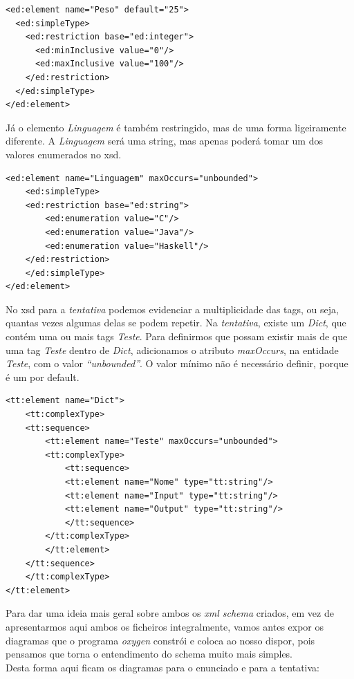 \begin{lstlisting}
<ed:element name="Peso" default="25">
  <ed:simpleType>
    <ed:restriction base="ed:integer">
      <ed:minInclusive value="0"/>
      <ed:maxInclusive value="100"/>
    </ed:restriction>
  </ed:simpleType>
</ed:element>
\end{lstlisting}
Já o elemento \textit{Linguagem} é também restringido, mas de uma forma ligeiramente diferente. A \textit{Linguagem} será uma string, mas
apenas poderá tomar um dos valores enumerados no xsd.\\

\begin{lstlisting}
<ed:element name="Linguagem" maxOccurs="unbounded">
    <ed:simpleType>
	<ed:restriction base="ed:string">
	    <ed:enumeration value="C"/>
	    <ed:enumeration value="Java"/>
	    <ed:enumeration value="Haskell"/>
	</ed:restriction>
    </ed:simpleType>
</ed:element>
\end{lstlisting}


No xsd para a \textit{tentativa} podemos evidenciar a multiplicidade das tags, ou seja, quantas vezes algumas delas se podem repetir.
Na \textit{tentativa}, existe um \textit{Dict}, que contém uma ou mais tags \textit{Teste}.
Para definirmos que possam existir mais de que uma tag \textit{Teste} dentro de \textit{Dict}, adicionamos o atributo \textit{maxOccurs},
na entidade \textit{Teste}, com o valor \textit{``unbounded''}. O valor mínimo não é necessário definir, porque é um por default.
\begin{lstlisting}
<tt:element name="Dict">
    <tt:complexType>
	<tt:sequence>
	    <tt:element name="Teste" maxOccurs="unbounded">
		<tt:complexType>
		    <tt:sequence>
			<tt:element name="Nome" type="tt:string"/>
			<tt:element name="Input" type="tt:string"/>
			<tt:element name="Output" type="tt:string"/>
		    </tt:sequence>
		</tt:complexType>
	    </tt:element>
	</tt:sequence>
    </tt:complexType>
</tt:element>
\end{lstlisting}

Para dar uma ideia mais geral sobre ambos os \textit{xml schema} criados, em vez de apresentarmos aqui ambos os ficheiros integralmente,
vamos antes expor os diagramas que o programa \textit{oxygen} constrói e coloca ao nosso dispor, pois pensamos que torna o entendimento do
schema muito mais simples.\\
\newpage
Desta forma aqui ficam os diagramas para o enunciado e para a tentativa:\\
 
